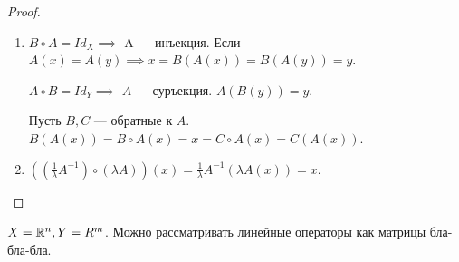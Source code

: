 \begin{proof}
    \begin{enumerate}
        \item $B \circ A = Id_X \implies$ A --- инъекция. Если  $A(x) = A(y) \implies x = B(A(x)) = B(A(y)) = y$.

             $A \circ B = Id_Y \implies$  $A$ --- суръекция.  $A(B(y)) = y$. 

             Пусть  $B, C$ --- обратные к  $A$.  $B(A(x)) = B \circ A(x) = x = C \circ A(x) = C(A(x))$.
         \item $((\frac{1}{\lambda}A^{-1}) \circ (\lambda A))(x) = \frac{1}{\lambda}A^{-1}(\lambda A(x)) = x$.
    \end{enumerate}
\end{proof}
\begin{example}
    $X = \mathbb{R}^n, Y = R^m$. Можно рассматривать линейные операторы как матрицы бла-бла-бла.
\end{example}

